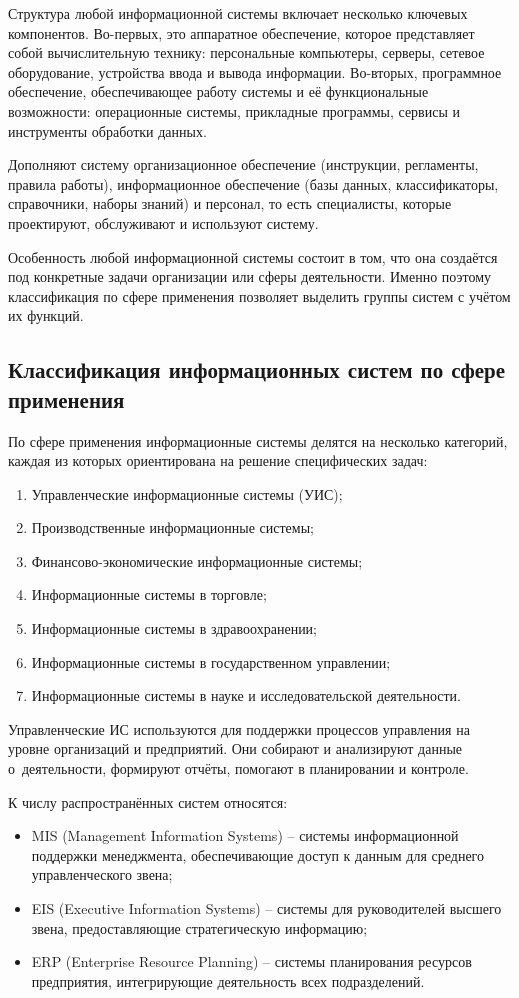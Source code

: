 \documentclass{ou}
\begin{document}
Структура любой информационной системы включает несколько ключевых компонентов. Во-первых, это аппаратное обеспечение, которое представляет собой вычислительную технику: персональные компьютеры, серверы, сетевое оборудование, устройства ввода и вывода информации. Во-вторых, программное обеспечение, обеспечивающее работу системы и её функциональные возможности: операционные системы, прикладные программы, сервисы и инструменты обработки данных.

Дополняют систему организационное обеспечение (инструкции, регламенты, правила работы), информационное обеспечение (базы данных, классификаторы, справочники, наборы знаний) и персонал, то есть специалисты, которые проектируют, обслуживают и используют систему.

Особенность любой информационной системы состоит в том, что она создаётся под конкретные задачи организации или сферы деятельности. Именно поэтому классификация по сфере применения позволяет выделить группы систем с учётом их функций.
\subsection{Классификация информационных систем по сфере применения}
По сфере применения информационные системы делятся на несколько категорий, каждая из которых ориентирована на решение специфических задач:
\begin{enumerate}[leftmargin=0em, itemindent=3.75em, nosep, label=\arabic*)]
\item Управленческие информационные системы (УИС);
\item Производственные информационные системы;
\item Финансово-экономические информационные системы;
\item Информационные системы в торговле;
\item Информационные системы в здравоохранении;
\item Информационные системы в государственном управлении;
\item Информационные системы в науке и исследовательской деятельности.
\end{enumerate}

Управленческие ИС используются для поддержки процессов управления на уровне организаций и предприятий. Они собирают и анализируют данные о~деятельности, формируют отчёты, помогают в планировании и контроле.

К числу распространённых систем относятся:
\begin{itemize}[label=-, leftmargin=0em, itemindent=3.35em, nosep]
\item MIS (Management Information Systems) -- системы информационной поддержки менеджмента, обеспечивающие доступ к данным для среднего управленческого звена;
\item EIS (Executive Information Systems) -- системы для руководителей высшего звена, предоставляющие стратегическую информацию;
\item ERP (Enterprise Resource Planning) -- системы планирования ресурсов предприятия, интегрирующие деятельность всех подразделений.
\end{itemize}
\end{document}
